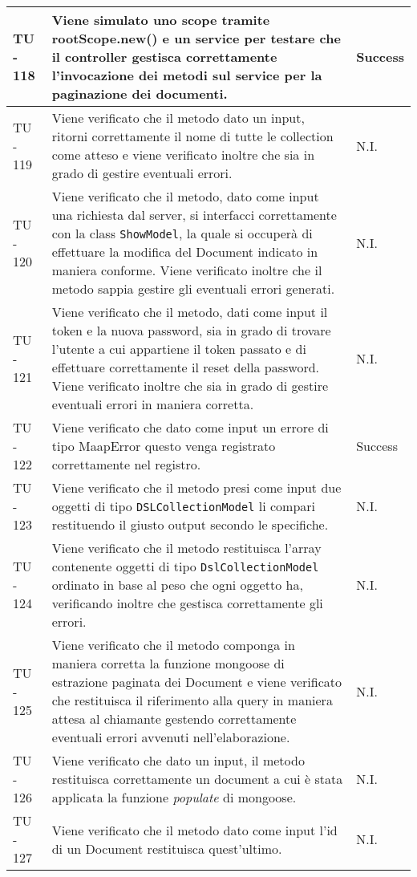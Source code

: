 \begin{center}
\begin{longtable}{ | p{3cm} | p{9cm} | p{2cm} | }
TU - 118 & Viene simulato uno scope tramite rootScope.new() e un service per testare che il controller gestisca correttamente l'invocazione dei metodi sul service per la paginazione dei documenti. & Success \\ \hline
TU - 119 & Viene verificato che il metodo dato un input,  ritorni correttamente il nome di tutte le collection come atteso e viene verificato inoltre che sia in grado di gestire eventuali errori.  & N.I. \\ \hline
TU - 120 & Viene verificato che il metodo, dato come input una richiesta dal server, si interfacci correttamente con la class \texttt{ShowModel}, la quale si occuperà di effettuare la modifica del Document indicato in maniera conforme. Viene verificato inoltre che il metodo sappia gestire gli eventuali errori generati. & N.I. \\ \hline
TU - 121 & Viene verificato che il metodo, dati come input il token e la nuova password, sia in grado di trovare l'utente a cui appartiene il token passato e di effettuare correttamente il reset della password.
Viene verificato inoltre che sia in grado di gestire eventuali errori in maniera corretta. & N.I. \\ \hline
TU - 122 & Viene verificato che dato come input un errore di tipo MaapError questo venga registrato correttamente nel registro. & Success \\ \hline
TU - 123 & Viene verificato che il metodo presi come input due oggetti di tipo \texttt{DSLCollectionModel} li compari restituendo il giusto output secondo le specifiche. & N.I. \\ \hline
TU - 124 & Viene verificato che il metodo restituisca l'array contenente oggetti di tipo \texttt{DslCollectionModel} ordinato in base al peso che ogni oggetto ha, verificando inoltre che gestisca correttamente gli errori. & N.I. \\ \hline
TU - 125 & Viene verificato che il metodo componga in maniera corretta la funzione mongoose di estrazione paginata dei Document e viene verificato che restituisca il riferimento alla query in maniera attesa al chiamante gestendo correttamente eventuali errori avvenuti nell'elaborazione. & N.I. \\ \hline
TU - 126 & Viene verificato che dato un input, il metodo restituisca correttamente un document a cui è stata applicata la funzione \textit{populate} di mongoose.  & N.I. \\ \hline
TU - 127 & Viene verificato che il metodo dato come input l'id di un Document restituisca quest'ultimo. & N.I. \\ \hline

\end{longtable}
\end{center}
